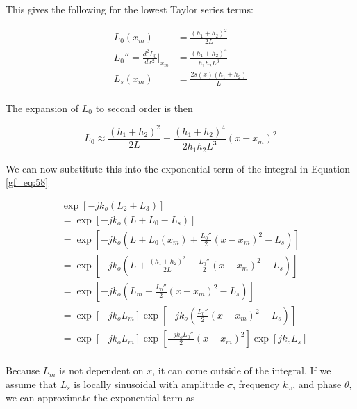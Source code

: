 \noindent This gives the following for the lowest Taylor series terms:

\begin{equation}
\begin{aligned}
L_0(x_m) &= \frac{(h_1+h_2)^2}{2L} \\
L_0''=\frac{d^2L_0}{dx^2}\bigg|_{x_m}  &= \frac{(h_1+h_2)^4}{h_1h_2L^3} \\
L_s(x_m) &= \frac{2s(x)(h_1 + h_2)}{L}\\
\end{aligned}
\label{gf_eq:65}
\end{equation}
\renewcommand{\baselinestretch}{2} \small\normalsize

\noindent The expansion of $L_0$ to second order is then

\begin{equation}
L_0 \approx \frac{(h_1+h_2)^2}{2L} + \frac{(h_1+h_2)^4}{2h_1h_2L^3}(x-x_m)^2
\label{gf_eq:66}
\end{equation}
\renewcommand{\baselinestretch}{2} \small\normalsize

\noindent We can now substitute this into the exponential term of the integral in Equation \ref{gf_eq:58}

\begin{equation}
\begin{aligned}
&\exp\left[-jk_o\left( L_2 + L_3\right) \right] \\
&= \exp\left[-jk_o\left( L+L_0-L_s\right) \right]\\
&= \exp\left[-jk_o\left( L+L_0(x_m) + \frac{L_0''}{2}(x-x_m)^2-L_s\right) \right]\\
&= \exp\left[-jk_o\left( L+\frac{(h_1+h_2)^2}{2L} + \frac{L_0''}{2}(x-x_m)^2-L_s\right)\right]\\
&=\exp\left[-jk_o\left(L_m+\frac{L_0''}{2}(x-x_m)^2-L_s\right)\right]\\
&=\exp\left[-jk_oL_m\right]\exp\left[-jk_o\left(\frac{L_0''}{2}(x-x_m)^2-L_s\right)\right]\\
&=\exp\left[-jk_oL_m\right]\exp\left[\frac{-jk_oL_0''}{2}(x-x_m)^2\right]\exp\left[jk_oL_s \right]\\
\label{gf_eq:67}
\end{aligned}
\end{equation}
\renewcommand{\baselinestretch}{2} \small\normalsize

Because $L_m$ is not dependent on $x$, it can come outside of the integral. If we assume that $L_s$ is locally sinusoidal with amplitude $\sigma$, frequency $k_{\omega}$, and phase $\theta$, we can approximate the exponential term as 

